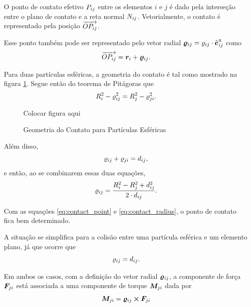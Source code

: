 O ponto de contato efetivo \({P}_{i j}\) entre os elementos \(i\) e \(j\) é dado pela interseção entre o plano de contato e a reta normal \({N}_{i j}\). Vetorialmente, o contato é representado pela posição \(\overrightarrow{O {P}_{i j}}\).

Esse ponto também pode ser representado pelo vetor radial \({\bm{\varrho}}_{i j} = {\varrho}_{i j}\cdot{\hat{\bm{e}}}_{i j}^{\text{n}}\) como
\begin{equation} \label{eq:contact_point}
	\overrightarrow{O {P}_{i j}} = {\bm{r}}_{i} + {\bm{\varrho}}_{i j}.
\end{equation}

Para duas partículas esféricas, a geometria do contato é tal como mostrado na figura \ref{fig:contact_geometry}. Segue então do teorema de Pitágoras que
\begin{equation*}
	{R}_{i}^2 - {\varrho}_{i j}^2 = {R}_{j}^2 - {\varrho}_{j i}^2.
\end{equation*}

\begin{figure}[h]
	\caption{Geometria do Contato para Partículas Esféricas}
	\centering
		\alert{Colocar figura aqui}
	\label{fig:contact_geometry}
\end{figure}

Além disso,
\begin{equation*}
	{\varrho}_{i j} + {\varrho}_{j i} = {d}_{i j},
\end{equation*}
e então, ao se combinarem essas duas equações,
\begin{equation} \label{eq:contact_radius}
	{\varrho}_{i j} = \dfrac{{R}_{i}^2 - {R}_{j}^2 + {d}_{i j}^2}{2\cdot{d}_{i j}}.
\end{equation}

Com as equações \eqref{eq:contact_point} e \eqref{eq:contact_radius}, o ponto de contato fica bem determinado.

A situação se simplifica para a colisão entre uma partícula esférica e um elemento plano, já que ocorre que
\begin{equation*}
	{\varrho}_{i j} = {d}_{i j}.
\end{equation*}

Em ambos os casos, com a definição do vetor radial \({\bm{\varrho}}_{i j}\), a componente de força \({\bm{F}}_{j i}\) está associada a uma componente de torque \({\bm{M}}_{j i}\) dada por
\begin{equation*}
	{\bm{M}}_{j i} = {\bm{\varrho}}_{i j}\cross{\bm{F}}_{j i}
\end{equation*}

